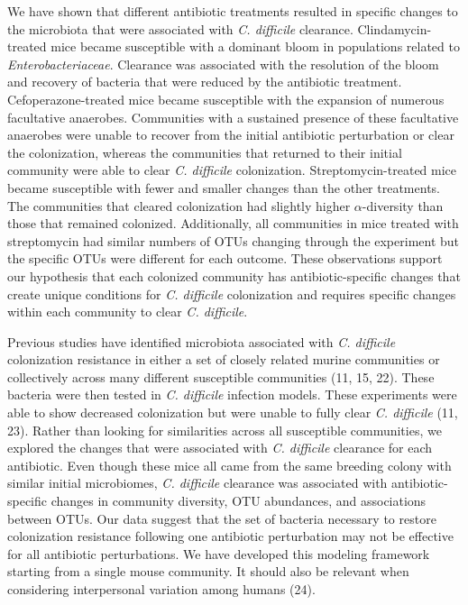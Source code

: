\documentclass[11pt,]{article}
\begin{document}
We have shown that different antibiotic treatments resulted in specific
changes to the microbiota that were associated with \emph{C. difficile}
clearance. Clindamycin-treated mice became susceptible with a dominant
bloom in populations related to \emph{Enterobacteriaceae}. Clearance was
associated with the resolution of the bloom and recovery of bacteria
that were reduced by the antibiotic treatment. Cefoperazone-treated mice
became susceptible with the expansion of numerous facultative anaerobes.
Communities with a sustained presence of these facultative anaerobes
were unable to recover from the initial antibiotic perturbation or clear
the colonization, whereas the communities that returned to their initial
community were able to clear \emph{C. difficile} colonization.
Streptomycin-treated mice became susceptible with fewer and smaller
changes than the other treatments. The communities that cleared
colonization had slightly higher \(\alpha\)-diversity than those that
remained colonized. Additionally, all communities in mice treated with
streptomycin had similar numbers of OTUs changing through the experiment
but the specific OTUs were different for each outcome. These
observations support our hypothesis that each colonized community has
antibiotic-specific changes that create unique conditions for \emph{C.
difficile} colonization and requires specific changes within each
community to clear \emph{C. difficile}.

Previous studies have identified microbiota associated with \emph{C.
difficile} colonization resistance in either a set of closely related
murine communities or collectively across many different susceptible
communities (11, 15, 22). These bacteria were then tested in \emph{C.
difficile} infection models. These experiments were able to show
decreased colonization but were unable to fully clear \emph{C.
difficile} (11, 23). Rather than looking for similarities across all
susceptible communities, we explored the changes that were associated
with \emph{C. difficile} clearance for each antibiotic. Even though
these mice all came from the same breeding colony with similar initial
microbiomes, \emph{C. difficile} clearance was associated with
antibiotic-specific changes in community diversity, OTU abundances, and
associations between OTUs. Our data suggest that the set of bacteria
necessary to restore colonization resistance following one antibiotic
perturbation may not be effective for all antibiotic perturbations. We
have developed this modeling framework starting from a single mouse
community. It should also be relevant when considering interpersonal
variation among humans (24).
\end{document}
